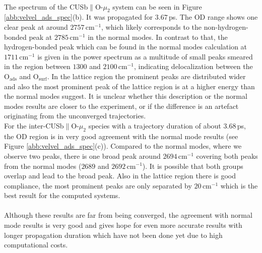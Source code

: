 \documentclass[11pt,DIV=13,BCOR=5mm,a4paper,headinclude]{scrbook}
\begin{document}
\\
The spectrum of the CUSb$\parallel$O-$\mu_2$ system can be seen in Figure \ref{abb:velvel_ads_spec}(b).
It was propagated for $3.67\,$ps.
The OD range shows one clear peak at around $2757\,$cm$^{-1}$, which likely corresponds to the non-hydrogen-bonded peak at $2785\,$cm$^{-1}$ in the normal modes.
In contrast to that, the hydrogen-bonded peak which can be found in the normal modes calculation at $1711\,$cm$^{-1}$ is given in the power spectrum as a multitude of small peaks smeared in the region between $1300$ and $2100\,$cm$^{-1}$, indicating delocalization between the O$_\textrm{ads}$ and O$_\textrm{surf}$.
In the lattice region the prominent peaks are distributed wider and also the most prominent peak of the lattice region is at a higher energy than the normal modes suggest.
It is unclear whether this description or the normal modes results are closer to the experiment, or if the difference is an artefact originating from the unconverged trajectories.
\\
For the inter-CUSb$\parallel$O-$\mu_2$ species with a trajectory duration of about $3.68\,$ps, the OD region is in very good agreement with the normal mode results (see Figure \ref{abb:velvel_ads_spec}(c)).
Compared to the normal modes, where we observe two peaks, there is one broad peak around $2694\,$cm$^{-1}$ covering both peaks from the normal modes ($2689$ and $2692\,$cm$^{-1}$).
It is possible that both groups overlap and lead to the broad peak.
Also in the lattice region there is good compliance, the most prominent peaks are only separated by $20\,$cm$^{-1}$ which is the best result for the computed systems.
\\
\\
Although these results are far from being converged, the agreement with normal mode results is very good and gives hope for even more accurate results with longer propagation duration which have not been done yet due to high computational costs.

\end{document}
